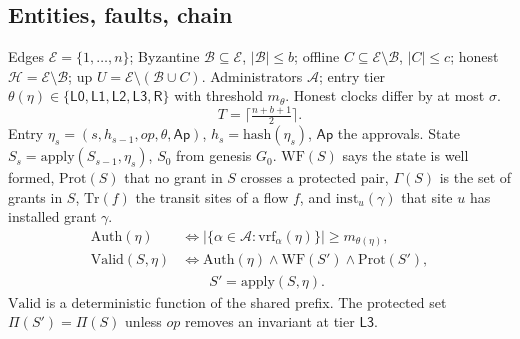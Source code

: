 \documentclass[conference]{IEEEtran}
\newcommand{\E}{\mathcal{E}}
\newcommand{\Hn}{\mathcal{H}}
\newcommand{\B}{\mathcal{B}}
\newcommand{\Val}{\mathrm{Valid}}
\begin{document}
\subsection{Entities, faults, chain}
Edges $\E=\{1,\dots,n\}$; Byzantine $\B\subseteq\E$, $|\B|\le b$; offline $C\subseteq\E\setminus\B$, $|C|\le c$; honest $\Hn=\E\setminus\B$; up $U=\E\setminus(\B\cup C)$. Administrators $\mathcal A$; entry tier $\theta(\eta)\in\{\mathsf{L0},\mathsf{L1},\mathsf{L2},\mathsf{L3},\mathsf{R}\}$ with threshold $m_\theta$. Honest clocks differ by at most $\sigma$.
\begin{equation}\label{eq:T}
T=\Big\lceil \tfrac{n+b+1}{2}\Big\rceil .
\end{equation}
Entry $\eta_s=(s,h_{s-1},op,\theta,\mathsf{Ap})$, $h_s=\mathrm{hash}(\eta_s)$, $\mathsf{Ap}$ the approvals. State $S_s=\mathrm{apply}(S_{s-1},\eta_s)$, $S_0$ from genesis $G_0$. $\mathrm{WF}(S)$ says the state is well formed, $\mathrm{Prot}(S)$ that no grant in $S$ crosses a protected pair, $\Gamma(S)$ is the set of grants in $S$, $\mathrm{Tr}(f)$ the transit sites of a flow $f$, and $\mathrm{inst}_u(\gamma)$ that site $u$ has installed grant $\gamma$.
\begin{align}
\mathrm{Auth}(\eta)&\Leftrightarrow \big|\{\alpha\in\mathcal A:\mathrm{vrf}_\alpha(\eta)\}\big|\ge m_{\theta(\eta)},\\
\Val(S,\eta)&\Leftrightarrow \mathrm{Auth}(\eta)\wedge \mathrm{WF}(S')\wedge \mathrm{Prot}(S'),\nonumber\\
&\qquad S'=\mathrm{apply}(S,\eta).
\end{align}
$\Val$ is a deterministic function of the shared prefix. The protected set $\Pi(S')=\Pi(S)$ unless $op$ removes an invariant at tier $\mathsf{L3}$.
\end{document}
